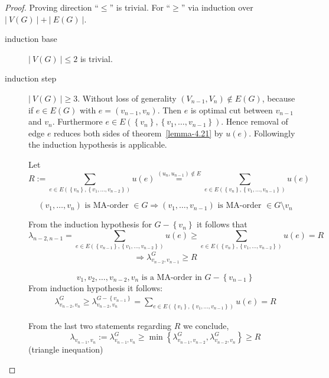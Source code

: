 \documentclass[a4paper]{article}
\theoremstyle{definition}
\newcommand{\card}[1]{\left|\:\!#1\:\!\right|}
\newcommand{\set}[1]{\left\{#1\right\}}
\begin{document}
\begin{proof}
  Proving direction ``$\leq$'' is trivial. For ``$\geq$'' via induction over $\card{V(G)} + \card{E(G)}$.
  \begin{description}
    \item[induction base] $\card{V(G)} \leq 2$ is trivial.
    \item[induction step]
      $\card{V(G)} \geq 3$. Without loss of generality $(V_{n-1}, V_{n}) \notin E(G)$,
      because if $e \in E(G)$ with $e = (v_{n-1}, v_n)$. Then $e$ is optimal cut between $v_{n-1}$
      and $v_n$. Furthermore $e \in E(\set{v_n}, \set{v_1, \ldots, v_{n-1}})$.
      Hence removal of edge $e$ reduces both sides of theorem~\ref{lemma-4.21} by $u(e)$.
      Followingly the induction hypothesis is applicable.

      Let
      \[
        R := \sum_{e \in E(\set{v_n}, \set{v_1, \ldots, v_{n-2}})} u(e)
          \stackrel{(u_n, u_{n-1}) \notin E}{=}
          \sum_{e \in E(\set{v_n}, \set{v_1, \ldots, v_{n-1}})} u(e)
      \]

      \[
        (v_1, \ldots, v_n) \text{ is MA-order } \in G
          \Rightarrow (v_1, \ldots, v_{n-1}) \text{ is MA-order } \in G \setminus {v_n}
      \]

      From the induction hypothesis for $G - \set{v_n}$ it follows that
      \[
        \lambda_{n-2,n-1} =
          \sum_{e \in E(\set{v_{n-1}}, \set{v_1, \ldots, v_{n-2}})} u(e)
        \geq
          \sum_{e \in E(\set{v_{n}}, \set{v_1, \ldots, v_{n-2}})} u(e)
        = R
      \] \begin{align}
        \Rightarrow \lambda^G_{v_{n-2}, v_{n-1}} \geq R
      \end{align}

      \[
        v_1, v_2, \ldots, v_{n-2}, v_n \text{ is a MA-order in } G-\set{v_{n-1}}
      \]
      From induction hypothesis it follows:
      \begin{align}
        \lambda^G_{v_{n-2},v_n} \geq \lambda^{G - \set{v_{n-1}}}_{v_{n-2}, v_n}
          = \sum_{e \in E(\set{v_1}, \set{v_1, \ldots, v_{n-1}})} u(e) = R
      \end{align}

      From the last two statements regarding $R$ we conclude,
      \[
        \lambda_{v_{n-1},v_n} := \lambda^G_{v_{n-1}, v_n}
          \geq \min{\set{\lambda^G_{v_{n-1}, v_{n-2}}, \lambda^G_{v_{n-2}, v_{n}}}}
          \geq R
      \]
      (triangle inequation)
  \end{description}
\end{proof}
\end{document}
